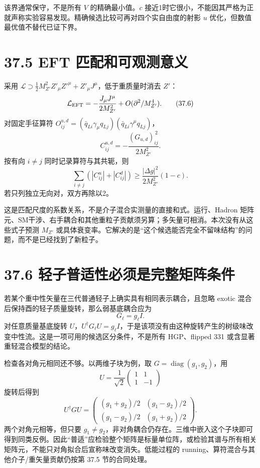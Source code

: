 \documentclass[
  11pt,
  oneside]{book}
\begin{document}
该界通常保守，不是所有 \(V\) 的精确最小值。\(c\)
接近1时它很小，不能因其严格为正就声称实验容易发现。精确候选比较可再对四个实自由度的射影
\(u\) 优化，但数值最优值不替代已证下界。

\section{37.5 EFT 匹配和可观测意义}

采用
\(\mathcal L\supset \tfrac12M_{Z'}^2Z'_\mu Z'^\mu+Z'_\mu J^\mu\)，低于重质量时消去
\(Z'\)： \[
\mathcal L_{\rm EFT}=-\frac{J_\mu J^\mu}{2M_{Z'}^2}
+O(\partial^2/M_{Z'}^4).
\tag{37.6}
\] 对固定手征算符
\(O_{ij}^{u,d}=(\bar q_{Li}\gamma_\mu q_{Lj}) (\bar q_{Li}\gamma^\mu q_{Lj})\)，
\[
C_{ij}^{u,d}=-\frac{(G_{u,d})_{ij}^{\,2}}{2M_{Z'}^2}.
\tag{37.7}
\] 按有向 \(i\ne j\) 同时记录算符与其共轭，则 \[
\sum_{i\ne j}(|C_{ij}^u|+|C_{ij}^d|)
\ge\frac{|\Delta g|^2}{2M_{Z'}^2}(1-c).
\tag{37.8}
\] 若只列独立无向对，双方再除以2。

这是匹配尺度的系数关系，不是介子混合实测量的直接和式。运行、Hadron
矩阵元、SM干涉、右手耦合和其他重粒子贡献须另算；多矢量可相消。本次没有从这些式子预测
\(M_{Z'}\)
或具体衰变率。它解决的是``这个候选能否完全不留味结构''的问题，而不是已经找到了新粒子。

\section{37.6 轻子普适性必须是完整矩阵条件}

若某个重中性矢量在三代普通轻子上确实具有相同表示耦合，且忽略 exotic
混合后保持酉的轻子质量旋转，那么弱基底耦合应为 \[
G_\ell=g_\ell I.
\] 对任意质量基底旋转
\(U\)，\(U^\dagger G_\ell U=g_\ell I\)，于是该项没有由这种旋转产生的树级味改变中性流。这是一项可用的候选区分条件，不是所有
HGP、flipped 331 或含显著重轻混合模型的结论。

检查各对角元相同还不够。以两维子块为例，取
\(G=\operatorname{diag}(g_1,g_2)\)，用 \[
U=\frac1{\sqrt2}\begin{pmatrix}1&1\\1&-1\end{pmatrix}
\] 旋转后得到 \[
U^\dagger GU=
\begin{pmatrix}
(g_1+g_2)/2&(g_1-g_2)/2\\
(g_1-g_2)/2&(g_1+g_2)/2
\end{pmatrix}.
\] 两个对角元相等，但只要
\(g_1\ne g_2\)，非对角耦合仍存在。三维中嵌入这个子块即可得到同类反例。因此``普适''应检验整个矩阵是标量单位阵，或检验其谱与所有相关矩阵元，不能只对角拟合后宣称味改变消失。低能过程的
running、算符混合与其他介子/重矢量贡献仍按第 37.5 节的合同处理。
\end{document}
